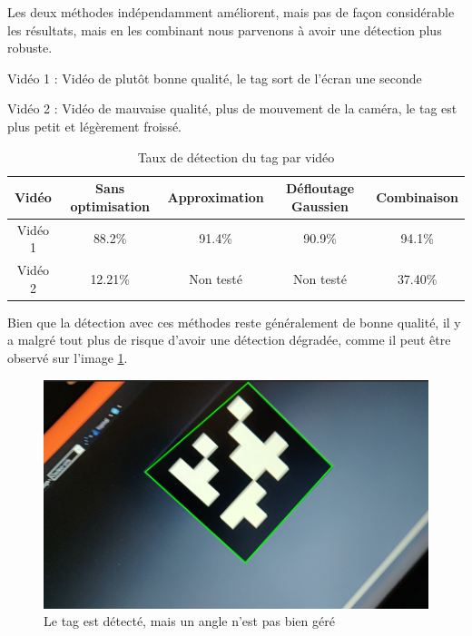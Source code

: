         Les deux méthodes indépendamment améliorent, mais pas de façon considérable les résultats, mais en les combinant nous parvenons à avoir une détection plus robuste.

        Vidéo 1 : Vidéo de plutôt bonne qualité, le tag sort de l'écran une seconde

        Vidéo 2 : Vidéo de mauvaise qualité, plus de mouvement de la caméra, le tag est plus petit et légèrement froissé.

        \begin{table}[!h]
            \begin{center}
                \begin{tabular}{ | c | c | c | c | c | }
                \hline
                Vidéo & Sans optimisation & Approximation & Défloutage Gaussien & Combinaison \\ \hline
                Vidéo 1 & 88.2\% & 91.4\% & 90.9\% & 94.1\% \\ \hline
                Vidéo 2 & 12.21\% & Non testé & Non testé & 37.40\% \\
                \hline
                \end{tabular}
        \end{center}
        \caption{Taux de détection du tag par vidéo}
        \end{table}

        Bien que la détection avec ces méthodes reste généralement de bonne qualité, il y a malgré tout plus de risque d'avoir une détection dégradée, comme il peut être observé sur l'image \ref{fig:cropped_tag}.

        \begin{figure}[!h]
            \centering
            \includegraphics[scale=0.25]{img/cropped_tag.png}
            \caption{Le tag est détecté, mais un angle n'est pas bien géré}
            \label{fig:cropped_tag}
        \end{figure}

